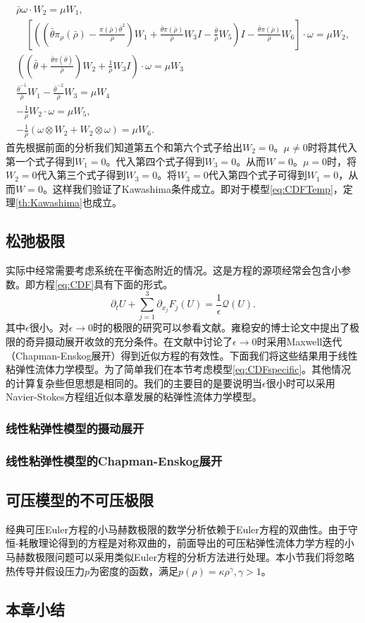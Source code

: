 \documentclass{article}
\begin{document}
	\begin{eqnarray*}
				\bar{\rho} \omega \cdot W_2 = \mu W_1, \\ 
				\quad [( (\bar{\theta}  \pi_{\rho}(\bar{\rho})-\frac{\pi(\bar{\rho})\bar{\theta}^2}{\bar{\rho}}) W_1 + \frac{\bar{\theta} \pi(\bar{\rho})}{\bar{\rho}}W_3 I - \frac{\bar{\theta}}{\bar{\rho}} W_5 )I- \frac{\bar{\theta} \pi(\bar{\rho})}{\bar{\rho}} W_6] \cdot \omega =\mu W_2, \\
				\left( (\bar{\theta} + \frac{\bar{\theta} \pi(\bar{\theta})}{\bar{\rho}})W_2 + \frac{1}{\bar{\rho}} W_3 I \right) \cdot \omega = \mu W_3 \\
				\frac{\bar{\theta}^{-1}}{\bar{\rho}} W_1 -\frac{\bar{\theta}^{-2}}{\bar{\rho}} W_3 = \mu W_4\\
		-\frac{1}{\bar{\rho}} W_2 \cdot \omega  = \mu W_5, \\
		-\frac{1}{\bar{\rho}} (\omega \otimes W_2 + W_2 \otimes \omega) = \mu W_6.
	\end{eqnarray*}
	首先根据前面的分析我们知道第五个和第六个式子给出$W_2=0$。$\mu \neq 0$时将其代入第一个式子得到$W_1=0$。代入第四个式子得到$W_3=0$。从而$W=0$。$\mu=0$时，将$W_2=0$代入第三个式子得到$W_3=0$。将$W_3=0$代入第四个式子可得到$W_1=0$，从而$W=0$。这样我们验证了Kawashima条件成立。即对于模型\eqref{eq:CDFTemp}，定理\ref{th:Kawashima}也成立。

	\subsection{松弛极限}
	实际中经常需要考虑系统在平衡态附近的情况。这是方程的源项经常会包含小参数\cite{}。即方程\eqref{eq:CDF}具有下面的形式。
	\begin{equation}\label{eq:CDFSingular}
		\partial_t U + \sum_{j=1}^3 \partial_{x_j} F_j(U) = \frac{1}{\epsilon}\mathcal{Q} (U) .
	\end{equation}
	其中$\epsilon$很小。对$\epsilon \rightarrow 0$时的极限的研究可以参看文献\cite{}。雍稳安的博士论文\cite{}中提出了极限的奇异摄动展开收敛的充分条件。在文献\cite{}中讨论了$\epsilon \rightarrow 0$时采用Maxwell迭代（Chapman-Enskog展开）得到近似方程的有效性。下面我们将这些结果用于线性粘弹性流体力学模型。为了简单我们在本节考虑模型\eqref{eq:CDFspecific}。其他情况的计算复杂些但思想是相同的。我们的主要目的是要说明当$\epsilon$很小时可以采用Navier-Stokes方程组近似本章发展的粘弹性流体力学模型。

	\subsubsection{线性粘弹性模型的摄动展开}
	
	\subsubsection{线性粘弹性模型的Chapman-Enskog展开}

	\subsection{可压模型的不可压极限}
	经典可压Euler方程的小马赫数极限的数学分析依赖于Euler方程的双曲性\cite{}。由于守恒-耗散理论得到的方程是对称双曲的，前面导出的可压粘弹性流体力学方程的小马赫数极限问题可以采用类似Euler方程的分析方法进行处理。本小节我们将忽略热传导并假设压力$p$为密度的函数，满足$p(\rho) = \kappa \rho^\gamma, \gamma>1$。
	\subsection{本章小结}

	
\end{document}
